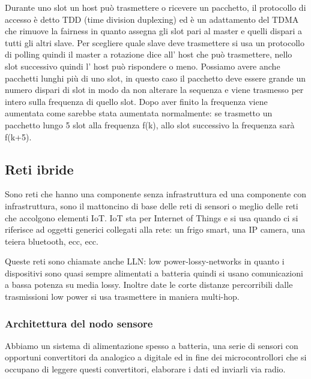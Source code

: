 Durante uno slot un host può trasmettere o ricevere un pacchetto, il protocollo di accesso è detto TDD (time division duplexing) ed è un adattamento del TDMA che rimuove la fairness in quanto assegna gli slot pari al master e quelli dispari a tutti gli altri slave.
Per scegliere quale slave deve trasmettere si usa un protocollo di polling quindi il master a rotazione dice all' host che può trasmettere, nello slot successivo quindi l' host può rispondere o meno.
Possiamo avere anche pacchetti lunghi più di uno slot, in questo caso il pacchetto deve essere grande un numero dispari di slot in modo da non alterare la sequenza e viene trasmesso per intero sulla frequenza di quello slot.
Dopo aver finito la frequenza viene aumentata come sarebbe stata aumentata normalmente: se trasmetto un pacchetto lungo 5 slot alla frequenza f(k), allo slot successivo la frequenza sarà f(k+5).

\subsection{Reti ibride}
Sono reti che hanno una componente senza infrastruttura ed una componente con infrastruttura, sono il mattoncino di base delle reti di sensori o meglio delle reti che accolgono elementi IoT.
IoT sta per Internet of Things e si usa quando ci si riferisce ad oggetti generici collegati alla rete: un frigo smart, una IP camera, una teiera bluetooth, ecc, ecc.

Queste reti sono chiamate anche LLN: low power-lossy-networks in quanto i dispositivi sono quasi sempre alimentati a batteria quindi si usano comunicazioni a bassa potenza su media lossy.
Inoltre date le corte distanze percorribili dalle trasmissioni low power si usa trasmettere in maniera multi-hop.

\subsubsection{Architettura del nodo sensore}
Abbiamo un sistema di alimentazione spesso a batteria, una serie di sensori con opportuni convertitori da analogico a digitale ed in fine dei microcontrollori che si occupano di leggere questi convertitori, elaborare i dati ed inviarli via radio.

